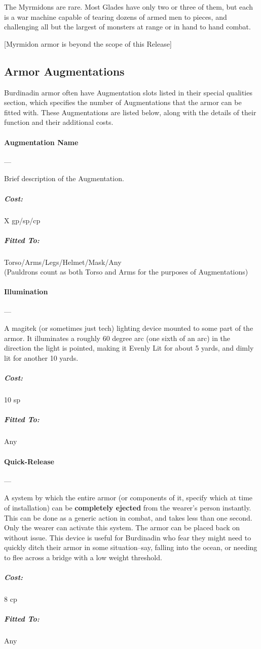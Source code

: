 \documentclass[oneside,11pt,english]{book}
\begin{document}
The Myrmidons are rare. Most Glades have only two or three of them, but each is a war machine capable 
of tearing dozens of armed men to pieces, and challenging all but the largest of monsters at range or in 
hand to hand combat. 

[Myrmidon armor is beyond the scope of this Release] 

\subsection{Armor Augmentations}
Burdinadin armor often have Augmentation slots listed in their special qualities section, which specifies 
the number of Augmentations that the armor can be fitted with. These Augmentations are listed below,
along with the details of their function and their additional costs.

\paragraph{Augmentation Name}---

Brief description of the Augmentation.
\vspace{-15pt}\subparagraph{Cost:} X gp/sp/cp
\vspace{-15pt}\subparagraph{Fitted To:} Torso/Arms/Legs/Helmet/Mask/Any\\ (Pauldrons count as both Torso and Arms for the purposes of Augmentations)

\paragraph{Illumination}---\quad[0]

A magitek (or sometimes just tech) lighting device mounted to some part of the armor. It illuminates a 
roughly 60 degree arc (one sixth of an arc) in the direction the light is pointed, making it Evenly Lit for 
about 5 yards, and dimly lit for another 10 yards. 
\vspace{-15pt}\subparagraph{Cost:} 10 sp
\vspace{-15pt}\subparagraph{Fitted To:} Any

\paragraph{Quick-Release}---\quad[0]

A system by which the entire armor (or components of it, specify which at time of installation) can be 
\textbf{completely ejected} from the wearer’s person instantly. This can be done as a generic action in combat, 
and takes less than one second. Only the wearer can activate this system. The armor can be placed back 
on without issue. This device is useful for Burdinadin who fear they might need to quickly ditch their 
armor in some situation--say, falling into the ocean, or needing to flee across a bridge with a low weight threshold.
\vspace{-15pt}\subparagraph{Cost:} 8 cp
\vspace{-15pt}\subparagraph{Fitted To:} Any
\end{document}
